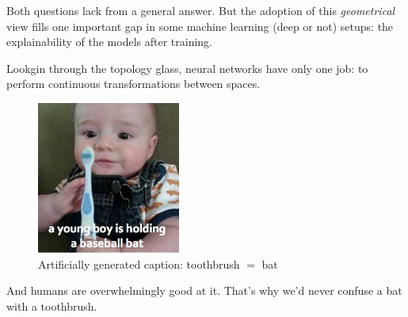 Both questions lack from a general answer. But the adoption of this \textit{
geometrical} view fills one important gap in some machine learning (deep or not) 
setups: the explainability of the models after training.

Lookgin through the topology glass, neural networks have only one job: to perform 
continuous transformations between spaces. 

	\begin{figure}[h!]
\begin{center}
		\includegraphics[height=5cm]{images/baby.jpg} %
		\caption{Artificially generated caption: toothbrush $=$ bat} %
		\label{baby} %
\end{center}
	\end{figure}

And humans are overwhelmingly good at it. That's why we'd never confuse a bat 
with a toothbrush.  

